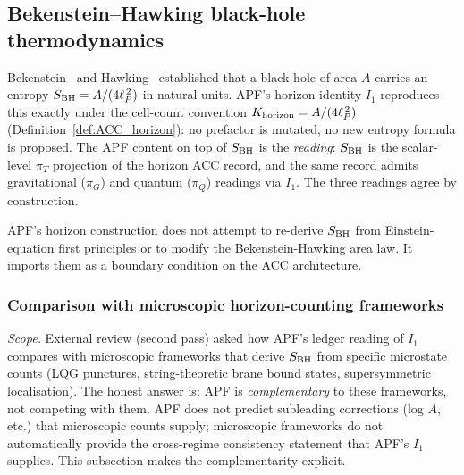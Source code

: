 \documentclass[11pt]{article}
\theoremstyle{plain}
\theoremstyle{definition}
\theoremstyle{remark}
\begin{document}
\bigskip

\subsection{Bekenstein--Hawking black-hole thermodynamics}\label{supp:N1}

Bekenstein~\cite{Bekenstein1973} and Hawking~\cite{Hawking1975} established that a black hole of area $A$ carries an entropy $S_{\rm BH} = A/(4\ell_P^{\,2})$ in natural units.  APF's horizon identity $I_1$ reproduces this exactly under the cell-count convention $K_{\rm horizon} = A/(4\ell_P^{\,2})$ (Definition~\ref{def:ACC_horizon}): no prefactor is mutated, no new entropy formula is proposed.  The APF content on top of $S_{\rm BH}$ is the \emph{reading}: $S_{\rm BH}$ is the scalar-level $\pi_T$ projection of the horizon ACC record, and the same record admits gravitational ($\pi_G$) and quantum ($\pi_Q$) readings via $I_1$.  The three readings agree by construction.

APF's horizon construction does not attempt to re-derive $S_{\rm BH}$ from Einstein-equation first principles or to modify the Bekenstein-Hawking area law.  It imports them as a boundary condition on the ACC architecture.

\subsubsection{Comparison with microscopic horizon-counting frameworks}\label{supp:N11}

\noindent\textit{Scope.}  External review (second pass) asked how APF's ledger reading of $I_1$ compares with microscopic frameworks that derive $S_{\rm BH}$ from specific microstate counts (LQG punctures, string-theoretic brane bound states, supersymmetric localisation).  The honest answer is: APF is \emph{complementary} to these frameworks, not competing with them.  APF does not predict subleading corrections (log $A$, etc.) that microscopic counts supply; microscopic frameworks do not automatically provide the cross-regime consistency statement that APF's $I_1$ supplies.  This subsection makes the complementarity explicit.
\end{document}
